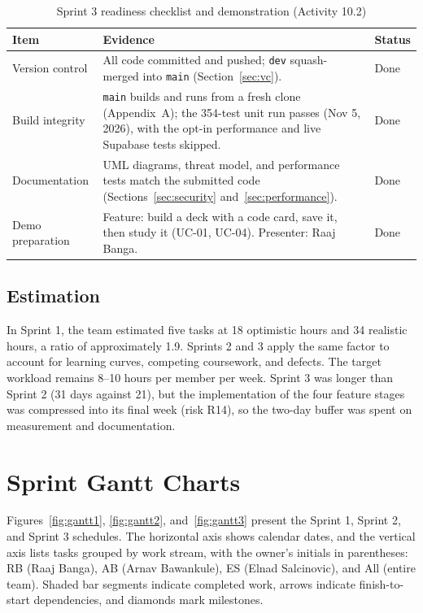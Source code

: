 \documentclass[12pt,letterpaper]{article}
\begin{document}
\begin{table}[H]
\centering
\caption{Sprint 3 readiness checklist and demonstration (Activity 10.2)}
\label{tab:readiness}
\begin{tabularx}{\textwidth}{@{}L{3.2cm} Y L{1.6cm}@{}}
\toprule
\textbf{Item} & \textbf{Evidence} & \textbf{Status} \\
\midrule
Version control & All code committed and pushed; \texttt{dev} squash-merged into \texttt{main} (Section~\ref{sec:vc}). & Done \\
Build integrity & \texttt{main} builds and runs from a fresh clone (Appendix~A); the 354-test unit run passes (Nov 5, 2026), with the opt-in performance and live Supabase tests skipped. & Done \\
Documentation & UML diagrams, threat model, and performance tests match the submitted code (Sections~\ref{sec:security} and~\ref{sec:performance}). & Done \\
Demo preparation & Feature: build a deck with a code card, save it, then study it (UC-01, UC-04). Presenter: Raaj Banga. & Done \\
\bottomrule
\end{tabularx}
\end{table}

\subsection{Estimation}
In Sprint 1, the team estimated five tasks at 18 optimistic hours and 34 realistic
hours, a ratio of approximately 1.9. Sprints 2 and 3 apply the same factor to account
for learning curves, competing coursework, and defects. The target workload remains
8--10 hours per member per week. Sprint 3 was longer than Sprint 2 (31 days against 21), but the
implementation of the four feature stages was compressed into its final week
(risk R14), so the two-day buffer was spent on measurement and documentation.

\section{Sprint Gantt Charts}
Figures~\ref{fig:gantt1}, \ref{fig:gantt2}, and~\ref{fig:gantt3} present the
Sprint 1, Sprint 2, and Sprint 3 schedules. The horizontal axis shows calendar dates, and the vertical axis lists tasks
grouped by work stream, with the owner's initials in parentheses: RB (Raaj Banga), AB
(Arnav Bawankule), ES (Elnad Salcinovic), and All (entire team). Shaded bar segments
indicate completed work, arrows indicate finish-to-start dependencies, and diamonds
mark milestones.
\end{document}
